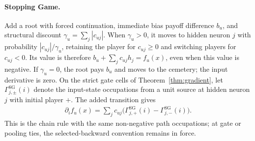 \documentclass[twoside]{article}
\newcommand{\1}{\mathbf{1}}
\begin{document}
\paragraph{Stopping Game.}
Add a root with forced continuation, immediate bias payoff difference $b_u$, and structural
discount $\gamma_u=\sum_j|c_{uj}|$. When $\gamma_u>0$, it moves to hidden neuron $j$ with
probability $|c_{uj}|/\gamma_u$, retaining the player for $c_{uj}\geq0$ and switching players
for $c_{uj}<0$. Its value is therefore $b_u+\sum_jc_{uj}h_j=f_u(x)$, even when this value is
negative. If $\gamma_u=0$, the root pays $b_u$ and moves to the cemetery; the input derivative
is zero. On the strict gate cells of Theorem~\ref{thm:gradient}, let
$\Gamma^{\mathrm{SG}}_{j,\pm}(i)$ denote the input-state occupations from a unit source at
hidden neuron $j$ with initial player $+$. The added transition gives
\begin{align}\label{eq:affine-readout-gradient}
    \partial_i f_u(x)=\sum_j c_{uj}
    \bigl(\Gamma^{\mathrm{SG}}_{j,+}(i)-\Gamma^{\mathrm{SG}}_{j,-}(i)\bigr).
\end{align}
This is the chain rule with the same non-negative path occupations; at gate or pooling ties,
the selected-backward convention remains in force.
\end{document}
